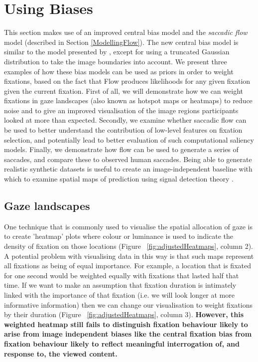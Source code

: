 

\section{Using Biases}
\label{sec:usingbiases}

This section makes use of an improved central bias model and the \textit{saccadic flow} model (described in Section \ref{ModellingFlow}). The new central bias model is similar to the model presented by \cite{clarke-tatler2014}, except for using a truncated Gaussian distribution to take the image boundaries into account. We present three examples of how these bias models can be used as priors in order to weight fixations, based on the fact that Flow produces likelihoods for any given fixation given the current fixation. First of all, we will demonstrate how we can weight fixations in gaze landscapes (also known as hotspot maps or heatmaps) to reduce noise and to give an improved visualisation of the image regions participants looked at more than expected. Secondly, we examine whether saccadic flow can be used to better understand the contribution of low-level features on fixation selection, and potentially lead to better evaluation of such computational saliency models. Finally, we demonstrate how flow can be used to generate a series of saccades, and compare these to observed human saccades. Being able to generate realistic synthetic datasets is useful to create an image-independent baseline with which to examine spatial maps of prediction using signal detection theory \citep[see][]{clarke-tatler2014}.

\subsection{Gaze landscapes}

One technique that is commonly used to visualise the spatial allocation of gaze is to create 'heatmap' plots where colour or luminance is used to indicate the density of fixation on those locations (Figure ~\ref{fig:adjustedHeatmaps}, column 2). A potential problem with visualising data in this way is that such maps represent all fixations as being of equal importance. For example, a location that is fixated for one second would be weighted equally with fixations that lasted half that time. If we want to make an assumption that fixation duration is intimately linked with the importance of that fixation (i.e. we will look longer at more informative information) then we can change our visualisation to weight fixations by their duration (Figure ~\ref{fig:adjustedHeatmaps}, column 3). \textbf{However, this weighted heatmap still fails to distinguish fixation behaviour likely to arise from image independent biases like the central fixation bias from fixation behaviour likely to reflect meaningful interrogation of, and response to, the viewed content.} 

